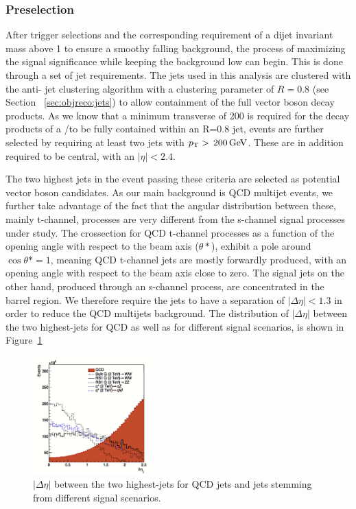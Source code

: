 \subsubsection{Preselection} 
\label{sec:searchI:preselection}
After trigger selections and the corresponding requirement of a dijet invariant mass above 1 \TeV to ensure a smoothy falling background, the process of maximizing the signal significance while keeping the background low can begin. This is done through a set of jet requirements. The jets used in this analysis are clustered with the anti-\kt{} jet clustering algorithm with a clustering parameter of $R=0.8$ (see Section ~\ref{sec:objreco:jets}) to allow containment of the full vector boson decay products. As we know that a minimum transverse of 200 \GeV is required for the decay products of a \PW/\PZ to be fully contained within an R=0.8 jet, events are further selected by requiring at least two jets with $p_{\mathrm{T}} > \text{\,200}{\ensuremath{\,\text{Ge\hspace{-.08em}V}}}$. These are in addition required to be central, with an $|\eta| < 2.4$. \par
The two highest \PT jets in the event passing these criteria are selected as potential vector boson candidates.
As our main background is QCD multijet events, we further take advantage of the fact that the angular distribution between these, mainly t-channel, processes are very different from the s-channel signal processes under study. The crossection for QCD t-channel processes as a function of the opening angle with respect to the beam axis ($\theta*$), exhibit a pole around $\cos \theta*=1$, meaning QCD t-channel jets are mostly forwardly produced, with an opening angle with respect to the beam axis close to zero. The signal jets on the other hand, produced through an s-channel process, are concentrated in the barrel region. We therefore require the jets to have a separation of $|\Delta\eta|<1.3$ in order to reduce the QCD multijets background.
The distribution of $|\Delta\eta|$ between the two highest-\PT jets for QCD as well as for different signal scenarios, is shown in Figure~\ref{fig:searchI:detaopt}

\begin{figure}[h!]
\centering
\includegraphics[width=0.4\textwidth]{figures/analysis/search1/misc/deta_opt.png}
\caption{ $|\Delta\eta|$  between the two highest-\PT jets for QCD jets and jets stemming from different signal scenarios.}
\label{fig:searchI:detaopt}
\end{figure}
 
